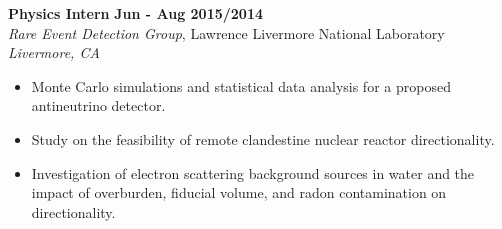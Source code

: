 \textbf{Physics Intern} \hfill \textbf{Jun - Aug 2015/2014} \\
\textsl{Rare Event Detection Group}, Lawrence Livermore National Laboratory \hfill \textsl{Livermore, CA} \\[-2.8ex]
\begin{itemize}[leftmargin=4ex] \itemsep -2pt
    \item Monte Carlo simulations and statistical data analysis for a proposed antineutrino detector.
    \item Study on the feasibility of remote clandestine nuclear reactor directionality. %
    \item Investigation of electron scattering background sources in water and the impact of overburden, fiducial volume, and radon contamination on directionality.
\end{itemize}

